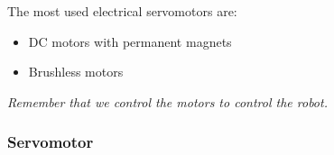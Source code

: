 The most used electrical servomotors are:

\begin{itemize}
    \item DC motors with permanent magnets
    \item Brushless motors
\end{itemize}

\textit{Remember that we control the motors to control the robot.}

\newpage

\subsubsection*{Servomotor}

\begin{figure} 
  \vspace{-1.5\baselineskip}
  \centering

\end{figure}
